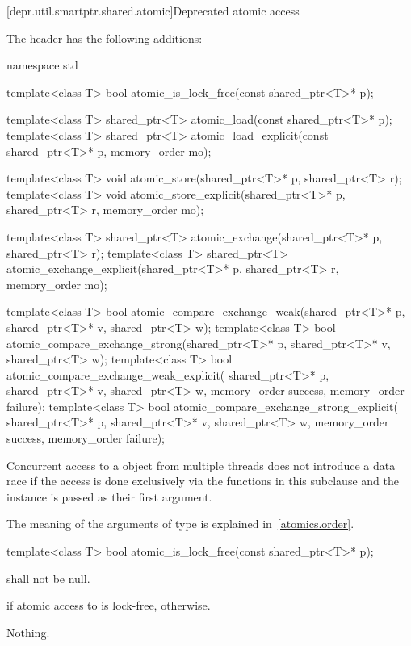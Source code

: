 [depr.util.smartptr.shared.atomic]{Deprecated  atomic access}

\pnum
The header  has the following additions:

%
\begin{codeblock}
namespace std {
  template<class T>
    bool atomic_is_lock_free(const shared_ptr<T>* p);

  template<class T>
    shared_ptr<T> atomic_load(const shared_ptr<T>* p);
  template<class T>
    shared_ptr<T> atomic_load_explicit(const shared_ptr<T>* p, memory_order mo);

  template<class T>
    void atomic_store(shared_ptr<T>* p, shared_ptr<T> r);
  template<class T>
    void atomic_store_explicit(shared_ptr<T>* p, shared_ptr<T> r, memory_order mo);

  template<class T>
    shared_ptr<T> atomic_exchange(shared_ptr<T>* p, shared_ptr<T> r);
  template<class T>
    shared_ptr<T> atomic_exchange_explicit(shared_ptr<T>* p, shared_ptr<T> r, memory_order mo);

  template<class T>
    bool atomic_compare_exchange_weak(shared_ptr<T>* p, shared_ptr<T>* v, shared_ptr<T> w);
  template<class T>
    bool atomic_compare_exchange_strong(shared_ptr<T>* p, shared_ptr<T>* v, shared_ptr<T> w);
  template<class T>
    bool atomic_compare_exchange_weak_explicit(
      shared_ptr<T>* p, shared_ptr<T>* v, shared_ptr<T> w,
      memory_order success, memory_order failure);
  template<class T>
    bool atomic_compare_exchange_strong_explicit(
      shared_ptr<T>* p, shared_ptr<T>* v, shared_ptr<T> w,
      memory_order success, memory_order failure);
}
\end{codeblock}

\pnum
Concurrent access to a  object from multiple threads does not
introduce a data race if the access is done exclusively via the functions in
this subclause and the instance is passed as their first argument.

\pnum
The meaning of the arguments of type  is explained in~\ref{atomics.order}.

%
\begin{itemdecl}
template<class T> bool atomic_is_lock_free(const shared_ptr<T>* p);
\end{itemdecl}

\begin{itemdescr}
\pnum
\requires {} shall not be null.

\pnum
\returns
{} if atomic access to  is lock-free,  otherwise.

\pnum
\throws
Nothing.
\end{itemdescr}

